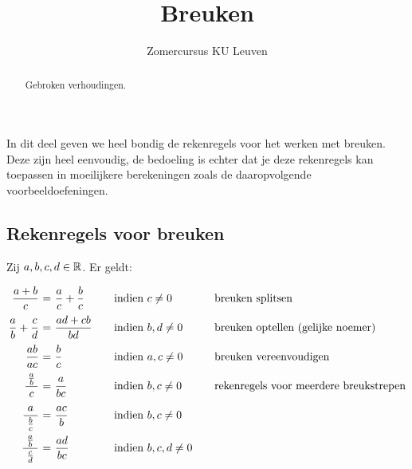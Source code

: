 \documentclass[numbers]{ximera}
\author{Zomercursus KU Leuven}
\title[Rekenvaardigheden:]{Breuken}
\begin{document}
\begin{abstract}
	Gebroken verhoudingen.
\end{abstract}
\maketitle

In dit deel geven we heel bondig de rekenregels voor het werken
met breuken. Deze zijn heel eenvoudig, de bedoeling is echter dat
je deze rekenregels kan toepassen in moeilijkere berekeningen
zoals de daaropvolgende voorbeeldoefeningen.

\subsection{Rekenregels voor breuken}
\begin{proposition}
Zij $a,b,c,d\in \mathbb{R}$. Er geldt:
\[
\arraycolsep=1.4pt\def\arraystretch{2.2}
\begin{array}{r@{\ }c@{\ }l@{\qquad}l@{\qquad}l}
\ds{\frac{a+b}{c}}&=&\ds{\frac{a}{c}+\frac{b}{c}}&\textrm{indien }c \neq 0&\textrm{breuken splitsen}\\
\ds{\frac{a}{b}+\frac{c}{d}}&=&\ds{\frac{ad+cb}{bd}}&\textrm{indien }b,d \neq 0&\textrm{breuken optellen (gelijke noemer)}\\
\ds{\frac{ab}{ac}}&=&\ds{\frac{b}{c}}&\textrm{indien }a,c \neq 0&\textrm{breuken vereenvoudigen}\\
\ds{\frac{\frac{a}{b}}{\ c\ }}&=&\ds{\frac{a}{bc}}&\textrm{indien }b,c \neq 0&
	\textrm{rekenregels voor meerdere breukstrepen}
\\
\ds{\frac{a}{\ \frac{b}{c}\ }}&=&\ds{\frac{ac}{b}}&\textrm{indien }b,c \neq 0&\\
\ds{\frac{\frac{a}{b}}{\ \frac{c}{d}\ }}&=&\ds{\frac{ad}{bc}}&\textrm{indien }b,c,d \neq 0&\\
\end{array}
\]
\end{proposition}
\end{document}
